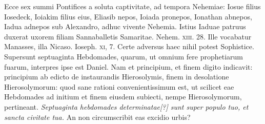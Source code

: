 Ecce sex summi Pontifices a soluta captivitate, ad tempora Nehemiae:
Iosue filius Iosedeck, Ioiakim filius eius, Eliasib nepos,
Ioiada pronepos, Ionathan abnepos, Iadua adnepos sub Alexandro,
adhuc vivente Nehemia.
Istius Iaduae patruus duxerat uxorem
filiam Sannaballetis Samaritae.
Nehem. \textsc{xiii}. 28.
Ille vocabatur
Manasses, illa Nicaso.
Ioseph. \textsc{xi}, 7.
Certe adversus haec
nihil potest Sophistice.
Supersunt septuaginta Hebdomades, quarum,
ut omnium fere prophetiarum fuarum, interpres ipse est Daniel.
Nam et principium, et finem digito indicavit: principium ab
edicto de instaurandis Hierosolymis, finem in desolatione Hierosolymorum:
quod sane rationi convenientissimum est, ut scilicet eae
Hebdomades ad initium et finem eiusdem subiecti, nempe Hierosolymorum,
pertineant.
\textit{Septuaginta hebdomades determinatae[?] sunt
super populo tuo, et sancta civitate tua.}
An non circumscribit eas
excidio urbis?

